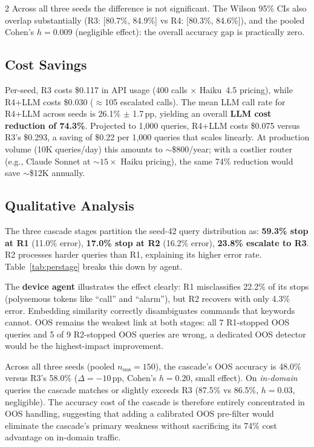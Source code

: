\documentclass[11pt,a4paper]{article}
\begin{document}
\begin{multicols}{2}
Across all three seeds the difference is not significant. The Wilson 95\% CIs also overlap substantially (R3: [80.7\%, 84.9\%] vs R4: [80.3\%, 84.6\%]), and the pooled Cohen's $h = 0.009$ (negligible effect): the overall accuracy gap is practically zero.

\subsection{Cost Savings}

Per-seed, R3 costs \$0.117 in API usage (400 calls $\times$ Haiku~4.5 pricing), while R4+LLM costs \$0.030 ($\approx$105 escalated calls). The mean LLM call rate for R4+LLM across seeds is 26.1\% $\pm$ 1.7\,pp, yielding an overall \textbf{LLM cost reduction of 74.3\%}. Projected to 1,000 queries, R4+LLM costs \$0.075 versus R3's \$0.293, a saving of \$0.22 per 1,000 queries that scales linearly. At production volume (10K queries/day) this amounts to $\sim$\$800/year; with a costlier router (e.g., Claude Sonnet at ${\sim}15{\times}$ Haiku pricing), the same 74\% reduction would save $\sim$\$12K annually.

\subsection{Qualitative Analysis}

The three cascade stages partition the seed-42 query distribution as: \textbf{59.3\% stop at R1} (11.0\% error), \textbf{17.0\% stop at R2} (16.2\% error), \textbf{23.8\% escalate to R3}. R2 processes harder queries than R1, explaining its higher error rate. Table~\ref{tab:perstage} breaks this down by agent.

The \textbf{device agent} illustrates the effect clearly: R1 misclassifies 22.2\% of its stops (polysemous tokens like ``call'' and ``alarm''), but R2 recovers with only 4.3\% error. Embedding similarity correctly disambiguates commands that keywords cannot. OOS remains the weakest link at both stages: all 7 R1-stopped OOS queries and 5 of 9 R2-stopped OOS queries are wrong, a dedicated OOS detector would be the highest-impact improvement.

Across all three seeds (pooled $n_{\text{oos}} = 150$), the cascade's OOS accuracy is 48.0\% versus R3's 58.0\% ($\Delta = -10$\,pp, Cohen's $h = 0.20$, small effect). On \emph{in-domain} queries the cascade matches or slightly exceeds R3 (87.5\% vs 86.5\%, $h = 0.03$, negligible). The accuracy cost of the cascade is therefore entirely concentrated in OOS handling, suggesting that adding a calibrated OOS pre-filter would eliminate the cascade's primary weakness without sacrificing its 74\% cost advantage on in-domain traffic.

\end{multicols}
\end{document}

